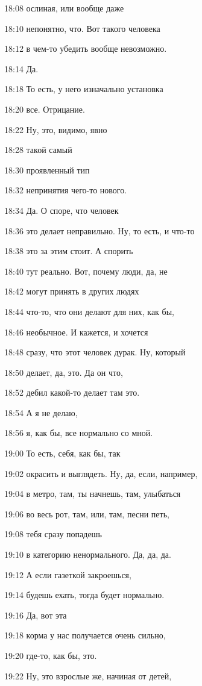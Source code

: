 18:08
ослиная, или вообще даже

18:10
непонятно, что. Вот такого человека

18:12
в чем-то убедить вообще невозможно.

18:14
Да.

18:18
То есть, у него изначально установка

18:20
все. Отрицание.

18:22
Ну, это, видимо, явно

18:28
такой самый

18:30
проявленный тип

18:32
непринятия чего-то нового.

18:34
Да. О споре, что человек

18:36
это делает неправильно. Ну, то есть, и что-то

18:38
это за этим стоит. А спорить

18:40
тут реально. Вот, почему люди, да, не

18:42
могут принять в других людях

18:44
что-то, что они делают для них, как бы,

18:46
необычное. И кажется, и хочется

18:48
сразу, что этот человек дурак. Ну, который

18:50
делает, да, это. Да он что,

18:52
дебил какой-то делает там это.

18:54
А я не делаю,

18:56
я, как бы, все нормально со мной.

19:00
То есть, себя, как бы, так

19:02
окрасить и выглядеть. Ну, да, если, например,

19:04
в метро, там, ты начнешь, там, улыбаться

19:06
во весь рот, там, или, там, песни петь,

19:08
тебя сразу попадешь

19:10
в категорию ненормального. Да, да, да.

19:12
А если газеткой закроешься,

19:14
будешь ехать, тогда будет нормально.

19:16
Да, вот эта

19:18
корма у нас получается очень сильно,

19:20
где-то, как бы, это.

19:22
Ну, это взрослые же, начиная от детей,

